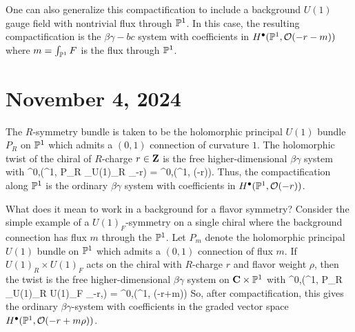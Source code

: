 \documentclass[11pt]{amsart}
\begin{document}
One can also generalize this compactification to include a background $U(1)$ gauge field with nontrivial flux through $\mathbb P^1$.
In this case, the resulting compactification is the $\beta\gamma-bc$ system with coefficients in $H^\bullet(\mathbb P^1, \mathcal O(-r-m))$ where $m = \int_{\mathbb P^1} F$ is the flux through $\mathbb P^1$.

\section{November 4, 2024}

The $R$-symmetry bundle is taken to be the holomorphic principal $U(1)$ bundle $P_R$ on $\mathbb P^1$ which admits a $(0,1)$ connection of curvature $1$.
The holomorphic twist of the chiral of $R$-charge $r \in\mathbf{Z}$ is the free higher-dimensional $\beta\gamma$ system with
\beqn
\gamma \in \Omega^{0,\bu}(\C \times \PP^1, P_R \times_{U(1)_R} \C_{-r}) = \Omega^{0,\bu}(\C \times \PP^1, \cO(-r)).
\eeqn
Thus, the compactification along $\mathbb P^1$ is the ordinary $\beta\gamma$ system with coefficients in $H^\bullet(\mathbb P^1, \mathcal O(-r))$.


What does it mean to work in a background for a flavor symmetry?
Consider the simple example of a $U(1)_F$-symmetry on a single chiral where the background connection has flux $m$ through the $\mathbb P^1$.
Let $P_{m}$ denote the holomorphic principal $U(1)$ bundle on $\mathbb P^1$ which admits a $(0,1)$ connection of flux $m$.
If $U(1)_R \times U(1)_F$ acts on the chiral with $R$-charge $r$ and flavor weight $\rho$, then the twist is the free higher-dimensional $\beta\gamma$ system on $\mathbf{C} \times \mathbb P^1$ with
\beqn
\gamma \in \Omega^{0,\bu}(\C \times \PP^1, P_R \times_{U(1)_R \times U(1)_F} \C_{-r,\rho}) = \Omega^{0,\bu}(\C \times \PP^1, \cO(-r+m\rho)) 
\eeqn
So, after compactification, this gives the ordinary $\beta\gamma$-system with coefficients in the graded vector space $H^\bullet(\mathbb P^1, \mathcal O(-r+m\rho))$.
\end{document}
